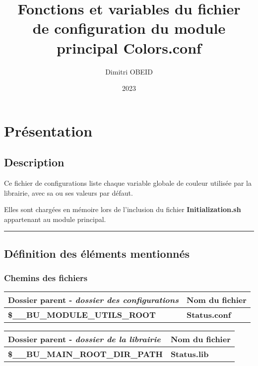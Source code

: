 \documentclass[a4paper,10pt]{article}
\title{\color{sec1}Fonctions et variables du fichier \\de configuration du module \\principal \color{path}Colors.conf}\color{text}
\author{Dimitri OBEID}
\date{2023}
\begin{document}
\maketitle
\newpage

\hypertarget{contents}{}
\tableofcontents
\newpage

\color{sec1}
\section{Présentation}\color{text}

\color{sec2}
\subsection{Description}\color{text}

\begin{justify}
    Ce fichier de configurations liste chaque variable globale de couleur utilisée par la librairie, avec sa ou ses valeurs par défaut.
\end{justify}

\begin{justify}
    Elles sont chargées en mémoire lors de l'inclusion du fichier \textbf{\color{path}Initialization.sh} appartenant au module principal.
\end{justify}



\color{sec2}\par\noindent\rule{\textwidth}{0.4pt}\color{text}

\color{sec2}
\subsection{Définition des éléments mentionnés}\color{text}

\color{sec3}
\subsubsection{Chemins des fichiers}\color{text}

\begin{justify}
    \begin{tabular}{|l|l|}
        \hline
        \textbf{Dossier parent} - \textit{dossier des configurations}    & \textbf{Nom du fichier}\\
        \hline
        \textbf{\color{vars}\$\_\_BU\_MODULE\_UTILS\_ROOT}      & \textbf{\color{path}Status.conf}\\
        \hline
    \end{tabular}


    \begin{tabular}{|l|l|}
        \hline
        \textbf{Dossier parent} - \textit{dossier de la librairie}       & \textbf{Nom du fichier}\\
        \hline
        \textbf{\color{vars}\$\_\_BU\_MAIN\_ROOT\_DIR\_PATH}    & \textbf{\color{path}Status.lib}\\
        \hline
    \end{tabular}
\end{justify}
\end{document}
